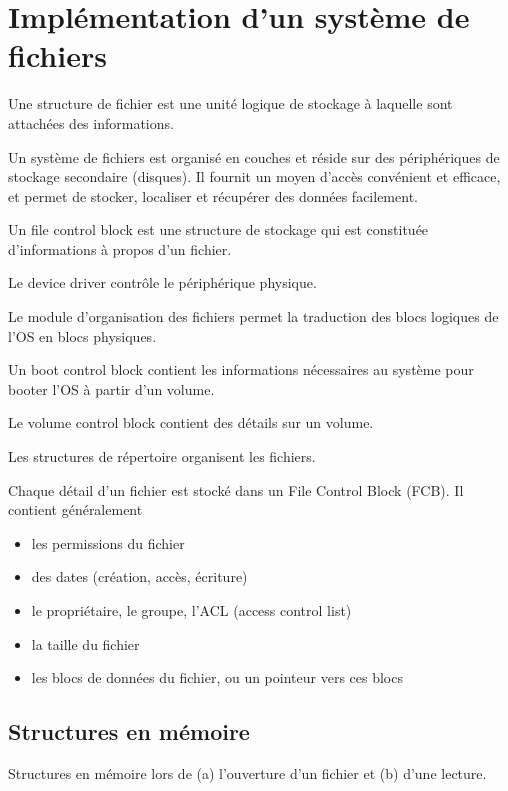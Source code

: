 \chapter{Implémentation d'un système de fichiers}

Une structure de fichier est une unité logique de stockage à laquelle sont attachées des informations.

Un système de fichiers est organisé en couches et réside sur des périphériques de stockage secondaire (disques). Il fournit un moyen d'accès convénient et efficace, et permet de stocker, localiser et récupérer des données facilement.

Un file control block est une structure de stockage qui est constituée d'informations à propos d'un fichier.

Le device driver contrôle le périphérique physique.


Le module d'organisation des fichiers permet la traduction des blocs logiques de l'OS en blocs physiques.

Un boot control block contient les informations nécessaires au système pour booter l'OS à partir d'un volume.

Le volume control block contient des détails sur un volume.

Les structures de répertoire organisent les fichiers.

Chaque détail d'un fichier est stocké dans un File Control Block (FCB). Il contient généralement

\begin{itemize}
	\item les permissions du fichier
	\item des dates (création, accès, écriture)
	\item le propriétaire, le groupe, l'ACL (access control list)
	\item la taille du fichier
	\item les blocs de données du fichier, ou un pointeur vers ces blocs
\end{itemize}

\section{Structures en mémoire}

Structures en mémoire lors de (a) l'ouverture d'un fichier et (b) d'une lecture.


